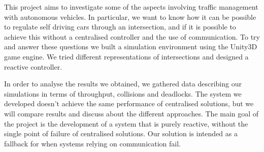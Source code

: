 \begin{em}
This project aims to investigate some of the aspects involving traffic management with autonomous vehicles.
In particular, we want to know how it can be possible to regulate self driving cars through an intersection, and if it is possible to achieve this without a centralised controller and the use of communication.
To try and answer these questions we built a simulation environment using the Unity3D game engine. We tried different representations of intersections and designed a reactive controller.

In order to analyse the results we obtained, we gathered data describing our simulations in terms of throughput, collisions and deadlocks.
The system we developed doesn't achieve the same performance of centralised solutions, 
but we will compare results and discuss about the different approaches.
The main goal of the project is the development of a system that is purely reactive, without the single point of failure of centralised solutions.
Our solution is intended as a fallback for when systems relying on communication fail.
\end{em}